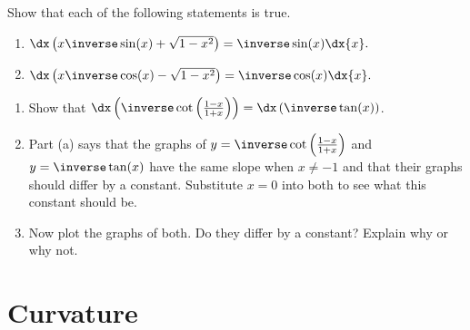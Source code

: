 \begin{embeddedproblem}
  Show that each of the following statements is true.
  \begin{enumerate}[label={\bf{}(\alph*)}]
    \item
      $\dx\left(x\inverse\sin(x)+\sqrt{1-x^2}\right) =
      \inverse\sin(x)\dx{x}.$
    \item
      $\dx\left(x\inverse\cos(x)-\sqrt{1-x^2}\right) =
      \inverse\cos(x)\dx{x}.$
    \end{enumerate}
\end{embeddedproblem}
\begin{embeddedproblem-enumerate}
  \begin{enumerate}[label={\bf{}(\alph*)}]
  \item Show that
    $\dx\left(\inverse\cot\left(\frac{1-x}{1+x}\right)\right)=
    \dx\left(\inverse\tan(x)\right)$.
  \item Part (a) says that the graphs of
    $y=\inverse\cot\left(\frac{1-x}{1+x}\right)$ and
    $y=\inverse\tan(x)$ have the same slope when $x\neq-1$  and that
    their graphs  should differ by a constant. Substitute $x=0$
    into both to see what this constant should be.
  \item Now plot the graphs of both. Do they differ by a constant?
    Explain why or why not.
  \end{enumerate}
\end{embeddedproblem-enumerate}

\section{Curvature}
\label{sec:curvature}

